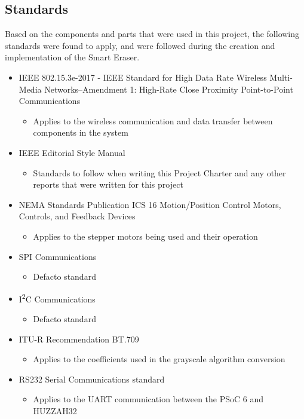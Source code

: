 \subsection{Standards}
\setlength{\parindent}{2.5ex} Based on the components and parts that were used in this project, the following standards were found to apply, and were followed during the creation and implementation of the Smart Eraser.
\begin{itemize}
	\item IEEE 802.15.3e-2017 - IEEE Standard for High Data Rate Wireless Multi-Media Networks--Amendment 1: High-Rate Close Proximity Point-to-Point Communications
	\begin{itemize}
		\item Applies to the wireless communication and data transfer between components in the system \cite{wifiStandards}
	\end{itemize}
	\item IEEE Editorial Style Manual
	\begin{itemize}
		\item Standards to follow when writing this Project Charter and any other reports that were written for this project \cite{ieee}
	\end{itemize}
	\item NEMA Standards Publication ICS 16 Motion/Position Control Motors, Controls, and Feedback Devices
	\begin{itemize}
		\item Applies to the stepper motors being used and their operation \cite{nema1}
	\end{itemize}
	\item SPI Communications
	\begin{itemize}
		\item Defacto standard
	\end{itemize}
	\item I\textsuperscript{2}C Communications
	\begin{itemize}
		\item Defacto standard
	\end{itemize}
	\item ITU-R Recommendation BT.709
	\begin{itemize}
		\item Applies to the coefficients used in the grayscale algorithm conversion \cite{rec709}
	\end{itemize}
		\item RS232 Serial Communications standard
	\begin{itemize}
		\item Applies to the UART communication between the PSoC 6 and HUZZAH32 \cite{UARTstandard}
	\end{itemize}
\end{itemize}
 
